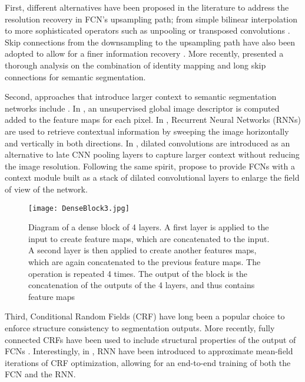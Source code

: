 \documentclass[10pt,twocolumn,letterpaper]{article}
\begin{document}
First, different alternatives have been proposed in the literature to address the resolution recovery in FCN's upsampling path; from simple bilinear interpolation \cite{Gatta14-deepvision, long2015fully, SegNet2015} to more sophisticated operators such as unpooling \cite{SegNet2015, noh2015learning} or transposed convolutions \cite{long2015fully}. Skip connections from the downsampling to the upsampling path have also been adopted to allow for a finer information recovery \cite{ronneberger2015u}. More recently, \cite{DrozdzalVCKP16} presented a thorough analysis on the combination of identity mapping \cite{HeZRS15} and long skip connections \cite{ronneberger2015u} for semantic segmentation.

Second, approaches that introduce larger context to semantic segmentation networks include \cite{Gatta14-deepvision, VisinKCBMC15, chen14semantic, YuKoltun2016}. In \cite{Gatta14-deepvision}, an unsupervised global image descriptor is computed added to the feature maps for each pixel. In \cite{VisinKCBMC15}, Recurrent Neural Networks (RNNs) are used to retrieve contextual information by sweeping the image horizontally and vertically in both directions. In \cite{chen14semantic}, dilated convolutions are introduced as an alternative to late CNN pooling layers to capture larger context without reducing the image resolution. Following the same spirit, \cite{YuKoltun2016} propose to provide FCNs with a context module built as a stack of dilated convolutional layers to enlarge the field of view of the network. 

\begin{figure}[t!]
\centering
  \texttt{[image: DenseBlock3.jpg]}
  \caption{\label{fig:DenseBlock}Diagram of a dense block of 4 layers. A first layer is applied to the input to create  feature maps, which are concatenated to the input. A second layer is then applied to create another  features maps, which are again concatenated to the previous feature maps. The operation is repeated 4 times. The output of the block is the concatenation of the outputs of the 4 layers, and thus contains  feature maps}
\end{figure}

Third, Conditional Random Fields (CRF) have long been a popular choice to enforce structure consistency to segmentation outputs. More recently, fully connected CRFs \cite{Koltun11} have been used to include structural properties of the output of FCNs \cite{chen14semantic}. Interestingly, in \cite{CRFasRNN}, RNN have been introduced to approximate mean-field iterations of CRF optimization, allowing for an end-to-end training of both the FCN and the RNN.
\end{document}
